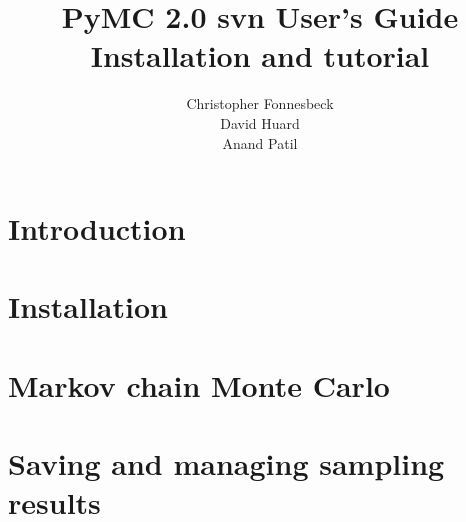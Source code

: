 \documentclass[]{manual}
\title{PyMC 2.0 svn User's Guide \\
Installation and tutorial}
\author{ Christopher Fonnesbeck\\ David Huard \\ Anand Patil }
\begin{document}
\maketitle

\tableofcontents

\chapter{Introduction} %


\chapter{Installation} %


\chapter{Markov chain Monte Carlo} %


\chapter{Saving and managing sampling results}




\end{document}
